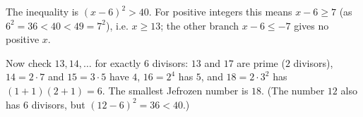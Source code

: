 The inequality is $(x-6)^2>40$. For positive integers this means $x-6\ge7$ (as $6^2=36<40<49=7^2$), i.e. $x\ge13$; the other branch $x-6\le-7$ gives no positive $x$.

Now check $13,14,\ldots$ for exactly $6$ divisors: $13$ and $17$ are prime ($2$ divisors), $14=2\cdot7$ and $15=3\cdot5$ have $4$, $16=2^4$ has $5$, and $18=2\cdot3^2$ has $(1+1)(2+1)=6$. The smallest Jefrozen number is $\boxed{18}$. (The number $12$ also has $6$ divisors, but $(12-6)^2=36<40$.)
